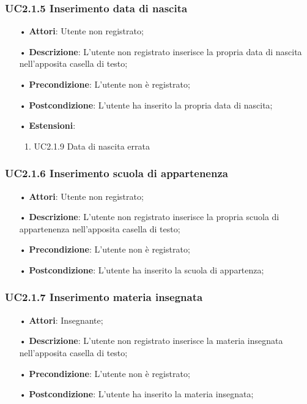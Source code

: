 \subsubsection{UC2.1.5 Inserimento data di nascita}
\begin{itemize}
	\item[•] \textbf{Attori}: Utente non registrato;
	\item[•] \textbf{Descrizione}: L'utente non registrato inserisce la propria data di nascita nell'apposita casella di testo;
	\item[•] \textbf{Precondizione}: L’utente non è registrato;
	\item[•] \textbf{Postcondizione}: L'utente ha inserito la propria data di nascita;
	\item[•] \textbf{Estensioni}:
		\begin{enumerate}
			\item UC2.1.9 Data di nascita errata
		\end{enumerate}
\end{itemize}

\subsubsection{UC2.1.6 Inserimento scuola di appartenenza}
\begin{itemize}
	\item[•] \textbf{Attori}: Utente non registrato;
	\item[•] \textbf{Descrizione}: L'utente non registrato inserisce la propria scuola di appartenenza nell'apposita casella di testo;
	\item[•] \textbf{Precondizione}: L’utente non è registrato;
	\item[•] \textbf{Postcondizione}: L'utente ha inserito la scuola di appartenza;
\end{itemize}

\subsubsection{UC2.1.7 Inserimento materia insegnata}
\begin{itemize}
	\item[•] \textbf{Attori}: Insegnante;
	\item[•] \textbf{Descrizione}: L'utente non registrato inserisce la materia insegnata nell'apposita casella di testo;
	\item[•] \textbf{Precondizione}: L’utente non è registrato;
	\item[•] \textbf{Postcondizione}: L'utente ha inserito la materia insegnata;
\end{itemize}

